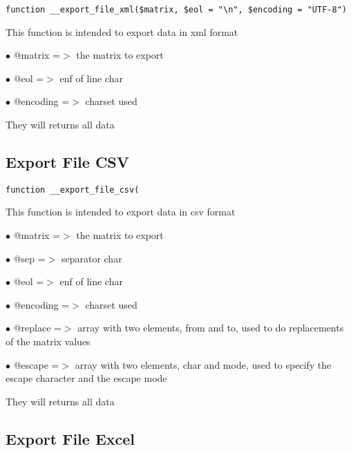 \documentclass[a4paper]{book}
\begin{document}
\begin{lstlisting}
function __export_file_xml($matrix, $eol = "\n", $encoding = "UTF-8")
\end{lstlisting}

This function is intended to export data in xml format

\begin{compactitem}
\item[\color{myblue}$\bullet$] @matrix   =$>$ the matrix to export
\item[\color{myblue}$\bullet$] @eol      =$>$ enf of line char
\item[\color{myblue}$\bullet$] @encoding =$>$ charset used
\end{compactitem}

They will returns all data

\hypertarget{toc122}{}
\subsection{Export File CSV}

\begin{lstlisting}
function __export_file_csv(
\end{lstlisting}

This function is intended to export data in csv format

\begin{compactitem}
\item[\color{myblue}$\bullet$] @matrix   =$>$ the matrix to export
\item[\color{myblue}$\bullet$] @sep      =$>$ separator char
\item[\color{myblue}$\bullet$] @eol      =$>$ enf of line char
\item[\color{myblue}$\bullet$] @encoding =$>$ charset used
\item[\color{myblue}$\bullet$] @replace  =$>$ array with two elements, from and to, used to do replacements of the matrix values
\item[\color{myblue}$\bullet$] @escape   =$>$ array with two elements, char and mode, used to specify the escape character and the
             escape mode
\end{compactitem}

They will returns all data

\hypertarget{toc123}{}
\subsection{Export File Excel}
\end{document}
